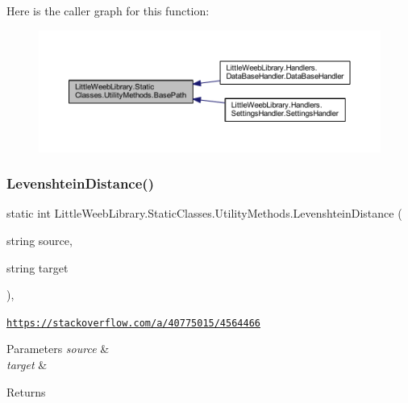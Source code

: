 Here is the caller graph for this function\+:\nopagebreak
\begin{figure}[H]
\begin{center}
\leavevmode
\includegraphics[width=350pt]{class_little_weeb_library_1_1_static_classes_1_1_utility_methods_a9fe4cf5d219f0453436fe9c85ad261bf_icgraph}
\end{center}
\end{figure}
\mbox{\label{class_little_weeb_library_1_1_static_classes_1_1_utility_methods_aaa6b7e7b9ba5429a7c91ef95bb408653}} 
\subsubsection{\texorpdfstring{Levenshtein\+Distance()}{LevenshteinDistance()}}
{\footnotesize\ttfamily static int Little\+Weeb\+Library.\+Static\+Classes.\+Utility\+Methods.\+Levenshtein\+Distance (\begin{DoxyParamCaption}\item[{string}]{source,  }\item[{string}]{target }\end{DoxyParamCaption})\hspace{0.3cm}{\ttfamily [static]}, {\ttfamily [private]}}



\href{https://stackoverflow.com/a/40775015/4564466}{\tt https\+://stackoverflow.\+com/a/40775015/4564466} 


\begin{DoxyParams}{Parameters}
{\em source} & \\
\hline
{\em target} & \\
\hline
\end{DoxyParams}
\begin{DoxyReturn}{Returns}

\end{DoxyReturn}


